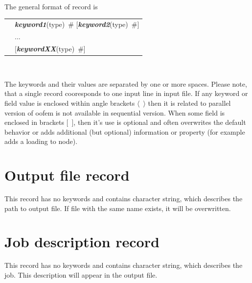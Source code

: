 \documentclass[a4paper]{article}
\makeatletter
\newcommand{\keywordnotype}[1]{\mbox{{\it{\bf{#1}}}}}
\newcommand{\keyword}[2]{\mbox{{\keywordnotype{#1}\tiny (#2)}}}
\newcommand{\field}[2]{\mbox{\keyword{#1}{#2}~\#}}
\newcommand{\optField}[2]{\mbox{[\field{#1}{#2}]}}
\newcommand{\Pmode}[1]{{\sffamily #1}}
\newenvironment{record}[1][]{\begin{tabular}{|ll}}{\end{tabular}\\}
\newcommand{\recentry}[2]{{#1}&{#2}\\}
\newcounter{rcc}
\newenvironment{record}[1][\textwidth]{\setcounter{rcc}{0}\begin{tabular*}{#1}{|ll@{\extracolsep{\fill}}r}}{\end{tabular*}\\}
\newcommand{\recentry}[2]{\ifthenelse{\value{rcc}>0}{&$\backslash$ \\}{\setcounter{rcc}{1}}{#1}&{#2}}
\makeatother
\begin{document}
The general format of record is \\

\noindent
\begin{record}
  \recentry{}{\field{keyword1}{type} \optField{keyword2}{type}}
  \recentry{}{...} \recentry{}{\optField{keywordXX}{type}}
\end{record}

The keywords and their values are separated by one or more spaces. Please note, that a single record cooresponds to one input line in input file. \Pmode{If any keyword or field value is enclosed within angle brackets $\langle$~$\rangle$ then it is related to parallel version of oofem is not available in sequential version.
When some field is enclosed in brackets [~], then it's use is optional
and often overwrites the default behavior or adds additional (but
optional) information or property (for example adds a loading to
node). }

\section{Output file record}
\label{_OutputFileRecord}
This record has no keywords and contains character string, which
describes the path to output file. If file with the same name exists,
it will be overwritten.

\section{Job description record}
\label{_JobDescriptionRecord}
This record has no keywords and contains character string, which
describes the job. This description will appear in the output
file.
\end{document}
